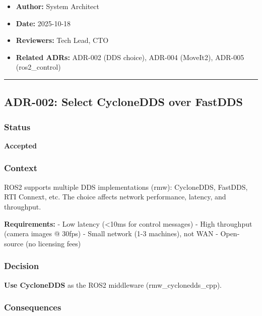 \documentclass[
]{article}
\providecommand{\tightlist}{%
  \setlength{\itemsep}{0pt}\setlength{\parskip}{0pt}}
\begin{document}
\begin{itemize}
\tightlist
\item
  \textbf{Author:} System Architect
\item
  \textbf{Date:} 2025-10-18
\item
  \textbf{Reviewers:} Tech Lead, CTO
\item
  \textbf{Related ADRs:} ADR-002 (DDS choice), ADR-004 (MoveIt2),
  ADR-005 (ros2\_control)
\end{itemize}

\begin{center}\rule{0.5\linewidth}{0.5pt}\end{center}

\hypertarget{adr-002-select-cyclonedds-over-fastdds}{%
\subsection{ADR-002: Select CycloneDDS over
FastDDS}\label{adr-002-select-cyclonedds-over-fastdds}}

\hypertarget{status-1}{%
\subsubsection{Status}\label{status-1}}

\textbf{Accepted}

\hypertarget{context-1}{%
\subsubsection{Context}\label{context-1}}

ROS2 supports multiple DDS implementations (rmw): CycloneDDS, FastDDS,
RTI Connext, etc. The choice affects network performance, latency, and
throughput.

\textbf{Requirements:} - Low latency (\textless10ms for control
messages) - High throughput (camera images @ 30fps) - Small network (1-3
machines), not WAN - Open-source (no licensing fees)

\hypertarget{decision-1}{%
\subsubsection{Decision}\label{decision-1}}

\textbf{Use CycloneDDS} as the ROS2 middleware (rmw\_cyclonedds\_cpp).

\hypertarget{consequences-1}{%
\subsubsection{Consequences}\label{consequences-1}}
\end{document}
